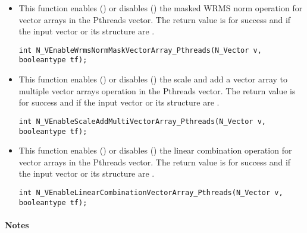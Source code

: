 \begin{itemize}
\item {}

This function enables () or disables () the masked WRMS
norm operation for vector arrays in the Pthreads vector. The return value is
 for success and  if the input vector or its  structure are
.

\verb|int N_VEnableWrmsNormMaskVectorArray_Pthreads(N_Vector v, booleantype tf);|


\item {}

This function enables () or disables () the scale and
add a vector array to multiple vector arrays operation in the Pthreads vector. The
return value is  for success and  if the input vector or its
 structure are .

\verb|int N_VEnableScaleAddMultiVectorArray_Pthreads(N_Vector v, booleantype tf);|


\item {}

This function enables () or disables () the linear
combination operation for vector arrays in the Pthreads vector. The return value
is  for success and  if the input vector or its  structure
are .

\verb|int N_VEnableLinearCombinationVectorArray_Pthreads(N_Vector v, booleantype tf);|

\end{itemize}
\paragraph{\bf Notes}                                                      
           

